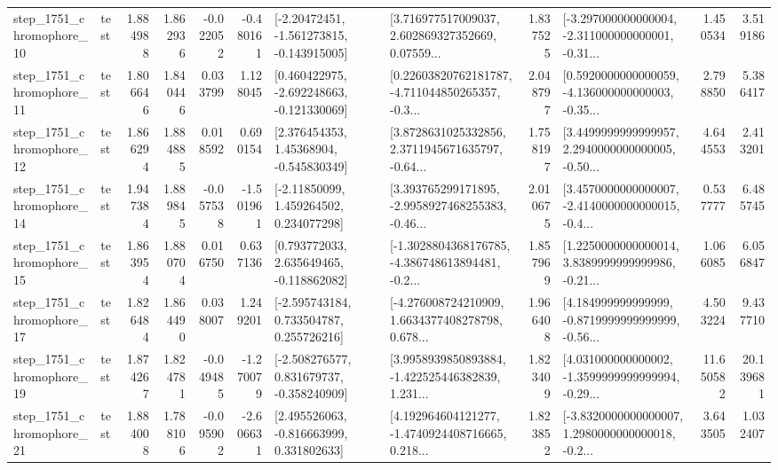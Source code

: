 \begin{tabular}{llrrrrllrlrr}
 step\_1751\_chromophore\_10 &      test &      1.884988 &    1.862936 &     -0.022052 & -0.480161 &   [-2.20472451, -1.561273815, -0.143915005] &  [3.716977517009037, 2.602869327352669, 0.07559... &       1.837525 &  [-3.297000000000004, -2.311000000000001, -0.31... &            1.450534 &          3.519186 \\
 step\_1751\_chromophore\_11 &      test &      1.806646 &    1.840446 &      0.033799 &  1.128045 &   [0.460422975, -2.692248663, -0.121330069] &  [0.22603820762181787, -4.711044850265357, -0.3... &       2.048797 &  [0.5920000000000059, -4.136000000000003, -0.35... &            2.798850 &          5.386417 \\
 step\_1751\_chromophore\_12 &      test &      1.866294 &    1.884885 &      0.018592 &  0.690154 &     [2.376454353, 1.45368904, -0.545830349] &  [3.8728631025332856, 2.3711945671635797, -0.64... &       1.758197 &  [3.4499999999999957, 2.2940000000000005, -0.50... &            4.644553 &          2.413201 \\
 step\_1751\_chromophore\_14 &      test &      1.947384 &    1.889845 &     -0.057538 & -1.501961 &     [-2.11850099, 1.459264502, 0.234077298] &  [3.393765299171895, -2.9958927468255383, -0.46... &       2.010675 &  [3.4570000000000007, -2.4140000000000015, -0.4... &            0.537777 &          6.485745 \\
 step\_1751\_chromophore\_15 &      test &      1.863954 &    1.880704 &      0.016750 &  0.637136 &    [0.793772033, 2.635649465, -0.118862082] &  [-1.3028804368176785, -4.386748613894481, -0.2... &       1.857969 &  [1.2250000000000014, 3.8389999999999986, -0.21... &            1.066085 &          6.056847 \\
 step\_1751\_chromophore\_17 &      test &      1.826484 &    1.864490 &      0.038007 &  1.249201 &    [-2.595743184, 0.733504787, 0.255726216] &  [-4.276008724210909, 1.6634377408278798, 0.678... &       1.966408 &  [4.184999999999999, -0.8719999999999999, -0.56... &            4.503224 &          9.437710 \\
 step\_1751\_chromophore\_19 &      test &      1.874267 &    1.824781 &     -0.049485 & -1.270079 &   [-2.508276577, 0.831679737, -0.358240909] &  [3.9958939850893884, -1.422525446382839, 1.231... &       1.823409 &  [4.031000000000002, -1.3599999999999994, -0.29... &           11.650582 &         20.139681 \\
 step\_1751\_chromophore\_21 &      test &      1.884008 &    1.788106 &     -0.095902 & -2.606631 &    [2.495526063, -0.816663999, 0.331802633] &  [4.192964604121277, -1.4740924408716665, 0.218... &       1.823852 &  [-3.8320000000000007, 1.2980000000000018, -0.2... &            3.643505 &          1.032407 \\

\end{tabular}
